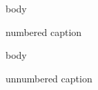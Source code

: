 \documentclass{article}
\begin{document}
\begin{figure}
    body
    \caption{numbered caption}
\end{figure}

\begin{figure}
    body
    \caption*{unnumbered caption}
\end{figure}
\end{document}
